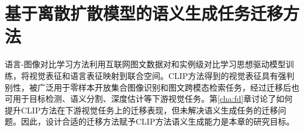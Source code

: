 \chapter{基于离散扩散模型的语义生成任务迁移方法}
\label{chap:ddcap}


语言-图像对比学习方法利用互联网图文数据对和实例级对比学习思想驱动模型训练，将视觉表征和语言表征映射到联合空间。CLIP方法得到的视觉表征具有强判别性，被广泛用于零样本开放集合图像识别和图文跨模态检索任务，经过迁移后也可用于目标检测、语义分割、深度估计等下游视觉任务。第\ref{cha:fd}章讨论了如何提升CLIP方法在下游视觉任务上的迁移表现，但未解决语义生成任务的迁移问题。因此，设计合适的迁移方法赋予CLIP方法语义生成能力是本章的研究目标。

